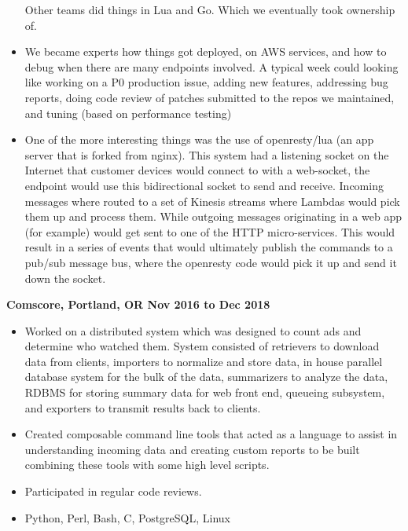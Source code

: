 \documentclass{res}
\begin{document}
\begin{resume}
\begin{itemize}
Other teams did things in Lua and Go. Which we eventually took ownership
of.

  \item
We became experts how things got deployed, on AWS services, and how to
debug when there are many endpoints involved.  A typical week could
looking like working on a P0 production issue, adding new features,
addressing bug reports, doing code review of patches submitted to the
repos we maintained, and tuning (based on performance testing)

  \item
One of the more interesting things was the use of openresty/lua (an app server
that is forked from nginx).  This system had a listening socket on the
Internet that customer devices would connect to with a web-socket, the endpoint
would use this bidirectional socket to send and receive.  Incoming messages
where routed to a set of Kinesis streams where Lambdas would pick them up and
process them.  While outgoing messages originating in a web app (for
example) would get sent to one of  the HTTP micro-services.  This would result
in a series of events that would ultimately publish the commands to a pub/sub
message bus, where the openresty code would pick it up and send it down the socket.
  \end{itemize}

  {\large \bf Comscore, Portland, OR \hfill Nov 2016 to Dec 2018}
  \begin{itemize}

  \item
    Worked on a distributed system which was designed to count ads and
    determine who watched them.  System consisted of retrievers to download
    data from clients, importers to normalize and store data, in house
    parallel database system for the bulk of the data, summarizers to
    analyze the data, RDBMS for storing summary data for
    web front end, queueing subsystem, and exporters to transmit
    results back to clients.

  \item
    Created composable command line tools that acted as a language to
    assist in understanding incoming data and creating custom reports to
    be built combining these tools with some high level scripts.

  \item
    Participated in regular code reviews.

  \item

    Python, Perl, Bash, C, PostgreSQL, Linux


\end{itemize}
\end{resume}
\end{document}
